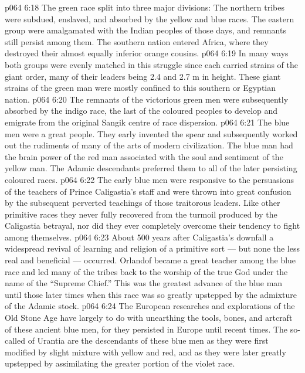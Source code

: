 \vs p064 6:18 The green race split into three major divisions: The northern tribes were subdued, enslaved, and absorbed by the yellow and blue races. The eastern group were amalgamated with the Indian peoples of those days, and remnants still persist among them. The southern nation entered Africa, where they destroyed their almost equally inferior orange cousins.
\vs p064 6:19 In many ways both groups were evenly matched in this struggle since each carried strains of the giant order, many of their leaders being 2.4 and 2.7 m in height. These giant strains of the green man were mostly confined to this southern or Egyptian nation.
\vs p064 6:20 The remnants of the victorious green men were subsequently absorbed by the indigo race, the last of the coloured peoples to develop and emigrate from the original Sangik centre of race dispersion.
\vs p064 6:21 \bibnobreakspace {} The blue men were a great people. They early invented the spear and subsequently worked out the rudiments of many of the arts of modern civilization. The blue man had the brain power of the red man associated with the soul and sentiment of the yellow man. The Adamic descendants preferred them to all of the later persisting coloured races.
\vs p064 6:22 The early blue men were responsive to the persuasions of the teachers of Prince Caligastia’s staff and were thrown into great confusion by the subsequent perverted teachings of those traitorous leaders. Like other primitive races they never fully recovered from the turmoil produced by the Caligastia betrayal, nor did they ever completely overcome their tendency to fight among themselves.
\vs p064 6:23 About 500 years after Caligastia’s downfall a widespread revival of learning and religion of a primitive sort --- but none the less real and beneficial --- occurred. Orlandof became a great teacher among the blue race and led many of the tribes back to the worship of the true God under the name of the “Supreme Chief.” This was the greatest advance of the blue man until those later times when this race was so greatly upstepped by the admixture of the Adamic stock.
\vs p064 6:24 The European researches and explorations of the Old Stone Age have largely to do with unearthing the tools, bones, and artcraft of these ancient blue men, for they persisted in Europe until recent times. The so\hyp{}called  of Urantia are the descendants of these blue men as they were first modified by slight mixture with yellow and red, and as they were later greatly upstepped by assimilating the greater portion of the violet race.
